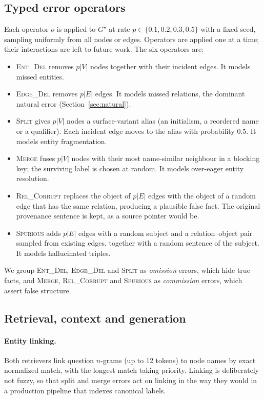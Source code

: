 \documentclass[11pt]{article}
\newcommand{\op}[1]{\textsc{#1}}
\begin{document}
\subsection{Typed error operators}
Each operator $o$ is applied to $G^\star$ at rate $p \in \{0.1, 0.2, 0.3, 0.5\}$ with a fixed seed, sampling uniformly from all nodes or edges. Operators are applied one at a time; their interactions are left to future work. The six operators are:
\begin{itemize}
\item \op{Ent\_Del} removes $p|V|$ nodes together with their incident edges. It models missed entities.
\item \op{Edge\_Del} removes $p|E|$ edges. It models missed relations, the dominant natural error (Section~\ref{sec:natural}).
\item \op{Split} gives $p|V|$ nodes a surface-variant alias (an initialism, a reordered name or a qualifier). Each incident edge moves to the alias with probability 0.5. It models entity fragmentation.
\item \op{Merge} fuses $p|V|$ nodes with their most name-similar neighbour in a blocking key; the surviving label is chosen at random. It models over-eager entity resolution.
\item \op{Rel\_Corrupt} replaces the object of $p|E|$ edges with the object of a random edge that has the same relation, producing a plausible false fact. The original provenance sentence is kept, as a source pointer would be.
\item \op{Spurious} adds $p|E|$ edges with a random subject and a relation--object pair sampled from existing edges, together with a random sentence of the subject. It models hallucinated triples.
\end{itemize}
We group \op{Ent\_Del}, \op{Edge\_Del} and \op{Split} as \emph{omission} errors, which hide true facts, and \op{Merge}, \op{Rel\_Corrupt} and \op{Spurious} as \emph{commission} errors, which assert false structure.

\subsection{Retrieval, context and generation}
\paragraph{Entity linking.} Both retrievers link question $n$-grams (up to 12 tokens) to node names by exact normalized match, with the longest match taking priority. Linking is deliberately not fuzzy, so that split and merge errors act on linking in the way they would in a production pipeline that indexes canonical labels.
\end{document}

